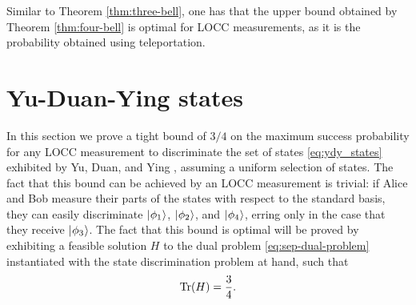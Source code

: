 \begin{remark}
  Similar to Theorem \ref{thm:three-bell}, one has that the upper bound
  obtained by Theorem \ref{thm:four-bell} is optimal for LOCC measurements,
  as it is the probability obtained using teleportation.
\end{remark}

\section{Yu-Duan-Ying states}

In this section we prove a tight bound of $3/4$ on the maximum success
probability for any LOCC measurement to discriminate the set of states 
\eqref{eq:ydy_states} exhibited by Yu, Duan, and Ying \cite{Yu12},
assuming a uniform selection of states.
The fact that this bound can be achieved by an LOCC measurement is trivial:
if Alice and Bob measure their parts of the states with respect to the standard
basis, they can easily discriminate $\lvert\mspace{0.5mu} \phi_1 \mspace{0.5mu} \rangle$, $\lvert\mspace{0.5mu} \phi_2 \mspace{0.5mu} \rangle$, and 
$\lvert\mspace{0.5mu} \phi_4 \mspace{0.5mu} \rangle$, erring only in the case that they receive $\lvert\mspace{0.5mu} \phi_3 \mspace{0.5mu} \rangle$.
The fact that this bound is optimal will be proved by exhibiting a 
feasible solution $H$ to the dual problem \eqref{eq:sep-dual-problem}
instantiated with the state discrimination problem at hand, such that
\begin{equation}
\operatorname{Tr}(H) = \frac{3}{4}.
\end{equation}

